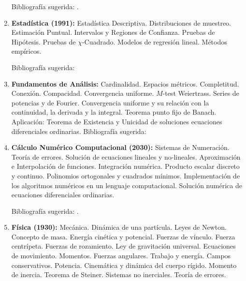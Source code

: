 \documentclass[a4paper, 12pt]{article}
\begin{document}
\begin{enumerate}
Bibliografía sugerida: \cite{ gentile,herstein, lang}.




 \item \textbf{Estadística (1991):} Estadística Descriptiva. Distribuciones de muestreo. Estimación Puntual. Intervalos y Regiones de Confianza. Pruebas de Hipótesis. Pruebas de $\chi$-Cuadrado. Modelos de regresión lineal. Métodos empíricos. 

Bibliografía sugerida: \cite{wasserman, devore, witten, boente, mosche}
 
\item \textbf{Fundamentos de Análisis:} Cardinalidad. Espacios métricos. Completitud. Conexión. Compacidad. Convergencia uniforme. $M$-test Weiertrass. Series de potencias y de Fourier. Convergencia uniforme y su relación con la continuidad, la  derivada y la  integral. Teorema punto fijo de Banach. Aplicación: Teorema de Existencia y Unicidad de soluciones ecuaciones diferenciales ordinarias.  
Bibliografía sugerida: \cite{RogerGodement658,StephenAbbott134,Simmons671,MichealOSearcoid674,SatishShirali675,VictorBryant676,J.Dieudonne678,WalterRudin681,NikolaosKatzourakis684,VilmosKomornik685,VicenteMontesinos686}





\item\textbf{Cálculo Numérico Computacional (2030):} Sistemas de Numeración.
Teoría de errores. Solución de ecuaciones lineales y no-lineales.
Aproximación e Interpolación de funciones. Integración numérica.
Producto escalar discreto y continuo. Polinomios ortogonales y
cuadrados mínimos. Implementación de los algoritmos numéricos en
un lenguaje computacional. Solución numérica de ecuaciones diferenciales ordinarias.

Bibliografía sugerida: \cite{burden, cheney}.









\item\textbf{Física (1930):} Mecánica. Dinámica de una partícula. Leyes
de Newton. Concepto de masa. Energía cinética y potencial. Fuerzas
de vínculo. Fuerza centrípeta. Fuerzas de rozamiento. Ley de
gravitación universal. Ecuaciones de movimiento. Momentos. Fuerzas
angulares. Trabajo y energía. Campos conservativos.
Potencia. Cinemática y  dinámica del cuerpo rígido. Momento de
inercia. Teorema de Steiner. Sistemas no inerciales. Teoría de
errores.


\end{enumerate}
\end{document}
